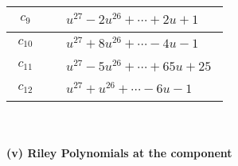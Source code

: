 \documentclass[1p]{elsarticle_modified}
\theoremstyle{definition}
\begin{document}
\begin{tabular}{m{50pt}|m{274pt}}
\hline $$\begin{aligned}c_{9}\end{aligned}$$&$\begin{aligned}
&u^{27}-2 u^{26}+\cdots+2 u+1
\end{aligned}$\\
\hline $$\begin{aligned}c_{10}\end{aligned}$$&$\begin{aligned}
&u^{27}+8 u^{26}+\cdots-4 u-1
\end{aligned}$\\
\hline $$\begin{aligned}c_{11}\end{aligned}$$&$\begin{aligned}
&u^{27}-5 u^{26}+\cdots+65 u+25
\end{aligned}$\\
\hline $$\begin{aligned}c_{12}\end{aligned}$$&$\begin{aligned}
&u^{27}+u^{26}+\cdots-6 u-1
\end{aligned}$\\
\hline
\end{tabular}\\~\\
\newpage\renewcommand{\arraystretch}{1}
\flushleft \textbf{(v) Riley Polynomials at the component}\newline \\
\end{document}
